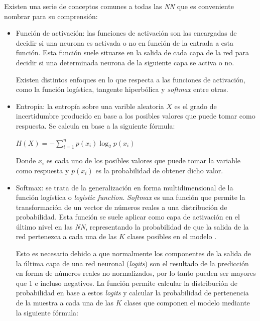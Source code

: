             Existen una serie de conceptos comunes a todas las \textit{NN} que es conveniente nombrar para su comprensión:


            \begin{itemize}

                \item Función de activación: las funciones de activación son las encargadas de decidir si una neurona es activada o no en función de la entrada a esta función. Esta función suele situarse en la salida de cada capa de la red para decidir si una determinada neurona de la siguiente capa se activa o no.

                    Existen distintos enfoques en lo que respecta a las funciones de activación, como la función logística, tangente hiperbólica y \textit{softmax} entre otras.


                \item Entropía: la entropía sobre una varible aleatoria $X$ es el grado de incertidumbre producido en base a los posibles valores que puede tomar como respuesta. Se calcula en base a la siguiente fórmula:

                    \begin{center}
                        $H(X) = -\sum_{i = 1}^n p(x_i) \log_2 p(x_i)$
                    \end{center}

                    Donde $x_i$ es cada uno de los posibles valores que puede tomar la variable como respuesta y $p(x_i)$ es la probabilidad de obtener dicho valor. 


                \item Softmax: se trata de la generalización en forma multidimensional de la función logística o \textit{logistic function}. \textit{Softmax} es una función que permite la transformación de un vector de números reales a una distribución de probabilidad. Esta función se suele aplicar como capa de activación en el último nivel en las \textit{NN}, representando la probabilidad de que la salida de la red pertenezca a cada una de las $K$ clases posibles en el modelo \cite{Softmax}. 

                    Esto es necesario debido a que normalmente los componentes de la salida de la última capa de una red neuronal (\textit{logits}) son el resultado de la predicción en forma de números reales no normalizados, por lo tanto pueden ser mayores que $1$ e incluso negativos. La función permite calcular la distribución de probabilidad en base a estos \textit{logits} y calcular la probabilidad de pertenencia de la muestra a cada una de las $K$ clases que componen el modelo mediante la siguiente fórmula:



\end{itemize}
